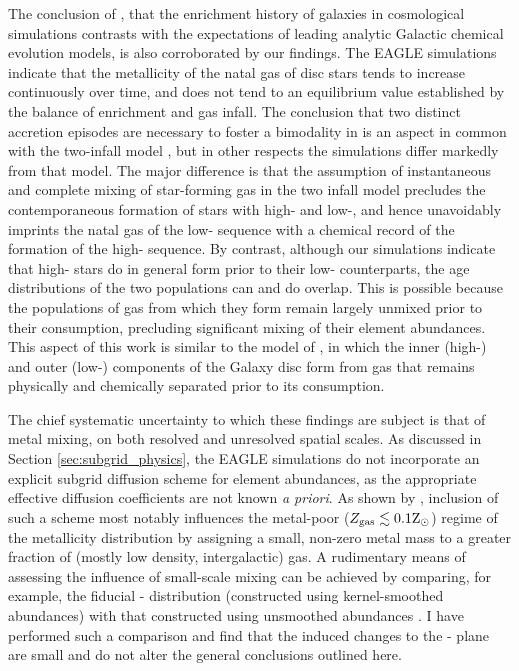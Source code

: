 The conclusion of \citet{2017arXiv170807834G}, that the enrichment history of galaxies in cosmological simulations contrasts with the expectations of leading analytic Galactic chemical evolution models, is also corroborated by our findings. The EAGLE simulations indicate that the metallicity of the natal gas of disc stars tends to increase continuously over time, and does not tend to an equilibrium value established by the balance of enrichment and gas infall. The conclusion that two distinct accretion episodes are necessary to foster a bimodality in \afe{} is an aspect in common with the \citet{1997ApJ...477..765C,2001ApJ...554.1044C} two-infall model \citep[see also][who arrived at similar conclusions by fitting empirical star formation histories to measurements of the SNIa delay time distribution]{2017ApJ...848...25M}, but in other respects the simulations differ markedly from that model. The major difference is that the assumption of instantaneous and complete mixing of star-forming gas in the two infall model precludes the contemporaneous formation of stars with high- and low-\afe{}, and hence unavoidably imprints the natal gas of the low-\afe{} sequence with a chemical record of the formation of the high-\afe{} sequence. By contrast, although our simulations indicate that high-\afe{} stars do in general form prior to their low-\afe{} counterparts, the age distributions of the two populations can and do overlap. This is possible because the populations of gas from which they form remain largely unmixed prior to their consumption, precluding significant mixing of their element abundances. This aspect of this work is similar to the model of \citet{2013A&A...560A.109H,2015A&A...578A..87S}, in which the inner (high-\afe{}) and outer (low-\afe{}) components of the Galaxy disc form from gas that remains physically and chemically separated prior to its consumption.

The chief systematic uncertainty to which these findings are subject is that of metal mixing, on both resolved and unresolved spatial scales. As discussed in Section \ref{sec:subgrid_physics}, the EAGLE simulations do not incorporate an explicit subgrid diffusion scheme for element abundances, as the appropriate effective diffusion coefficients are not known \emph{a priori}. As shown by \citet[][see their Fig. 9]{2010MNRAS.407.1581S}, inclusion of such a scheme most notably influences the metal-poor  ($Z_{\rm gas} \lesssim 0.1 {\rm Z}_\odot$) regime of the metallicity distribution by assigning a small, non-zero metal mass to a greater fraction of (mostly low density, intergalactic) gas. A rudimentary means of assessing the influence of small-scale mixing can be achieved by comparing, for example, the fiducial \afe{}-\feh{} distribution (constructed using kernel-smoothed abundances) with that constructed using unsmoothed abundances \citep[see e.g. Appendix B of][]{2013MNRAS.432.3005C}. I have performed such a comparison and find that the induced changes to the \afe{}-\feh{} plane are small and do not alter the general conclusions outlined here. {}

